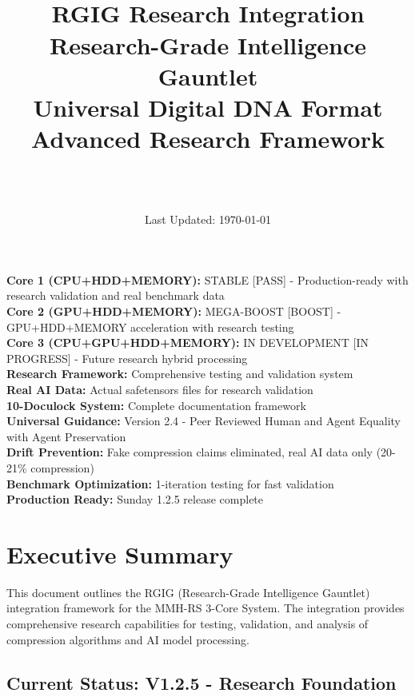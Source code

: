 \documentclass[12pt,a4paper]{article}
\title{\Huge\textbf{\project\ \version}\\[0.5cm]
\Large\textbf{RGIG Research Integration}\\[0.3cm]
\large Research-Grade Intelligence Gauntlet\\[0.5cm]
\large Universal Digital DNA Format\\[0.3cm]
\large Advanced Research Framework}
\author{\Large\authorname\\[0.2cm]\email\\[0.2cm]\github}
\date{\large Last Updated: \today}
\begin{document}
\maketitle
\thispagestyle{empty}

\begin{tcolorbox}[colback=blue!10,colframe=blue!50,title=\textbf{V2.3 - 3-Core System - RGIG RESEARCH INTEGRATION - ENHANCED STANDARD}]
\textbf{Core 1 (CPU+HDD+MEMORY):} STABLE [PASS] - Production-ready with research validation and real benchmark data\\
\textbf{Core 2 (GPU+HDD+MEMORY):} MEGA-BOOST [BOOST] - GPU+HDD+MEMORY acceleration with research testing\\
\textbf{Core 3 (CPU+GPU+HDD+MEMORY):} IN DEVELOPMENT [IN PROGRESS] - Future research hybrid processing\\
\textbf{Research Framework:} Comprehensive testing and validation system\\
\textbf{Real AI Data:} Actual safetensors files for research validation\\
\textbf{10-Doculock System:} Complete documentation framework\\
\textbf{Universal Guidance:} Version 2.4 - Peer Reviewed Human and Agent Equality with Agent Preservation\\
\textbf{Drift Prevention:} Fake compression claims eliminated, real AI data only (20-21\% compression)\\
\textbf{Benchmark Optimization:} 1-iteration testing for fast validation\\
\textbf{Production Ready:} Sunday 1.2.5 release complete
\end{tcolorbox}

\tableofcontents
\newpage

\section{Executive Summary}

This document outlines the RGIG (Research-Grade Intelligence Gauntlet) integration framework for the MMH-RS 3-Core System. The integration provides comprehensive research capabilities for testing, validation, and analysis of compression algorithms and AI model processing.

\subsection{Current Status: V1.2.5 - Research Foundation}
\end{document}
